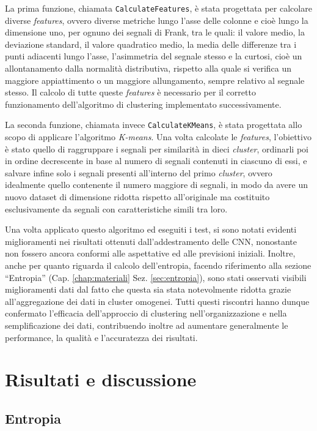 La prima funzione, chiamata \texttt{CalculateFeatures}, è stata progettata per calcolare diverse \textit{features}, ovvero diverse metriche lungo l'asse delle colonne e cioè lungo la dimensione uno, per ognuno dei segnali di Frank, tra le quali: il valore medio, la deviazione standard, il valore quadratico medio, la media delle differenze tra i punti adiacenti lungo l'asse, l'asimmetria del segnale stesso e la curtosi, cioè un allontanamento dalla normalità distributiva, rispetto alla quale si verifica un maggiore appiattimento o un maggiore allungamento, sempre relativo al segnale stesso. Il calcolo di tutte queste \textit{features} è necessario per il corretto funzionamento dell'algoritmo di clustering implementato successivamente.

La seconda funzione, chiamata invece \texttt{CalculateKMeans}, è stata progettata allo scopo di applicare l'algoritmo \textit{K-means}. Una volta calcolate le \textit{features}, l'obiettivo è stato quello di raggruppare i segnali per similarità in dieci \textit{cluster}, ordinarli poi in ordine decrescente in base al numero di segnali contenuti in ciascuno di essi, e salvare infine solo i segnali presenti all'interno del primo \textit{cluster}, ovvero idealmente quello contenente il numero maggiore di segnali, in modo da avere un nuovo dataset di dimensione ridotta rispetto all'originale ma costituito esclusivamente da segnali con caratteristiche simili tra loro.

Una volta applicato questo algoritmo ed eseguiti i test, si sono notati evidenti miglioramenti nei risultati ottenuti dall'addestramento delle CNN, nonostante non fossero ancora conformi alle aspettative ed alle previsioni iniziali. Inoltre, anche per quanto riguarda il calcolo dell'entropia, facendo riferimento alla sezione ``Entropia'' (Cap. \ref{chap:materiali} Sez. \ref{sec:entropia}), sono stati osservati visibili miglioramenti dati dal fatto che questa sia stata notevolmente ridotta grazie all'aggregazione dei dati in cluster omogenei. Tutti questi riscontri hanno dunque confermato l'efficacia dell'approccio di clustering nell'organizzazione e nella semplificazione dei dati, contribuendo inoltre ad aumentare generalmente le performance, la qualità e l'accuratezza dei risultati.

\chapter{Risultati e discussione}
\label{chap:risultati}

\section{Entropia}
\label{sec:entropia_risultati}

